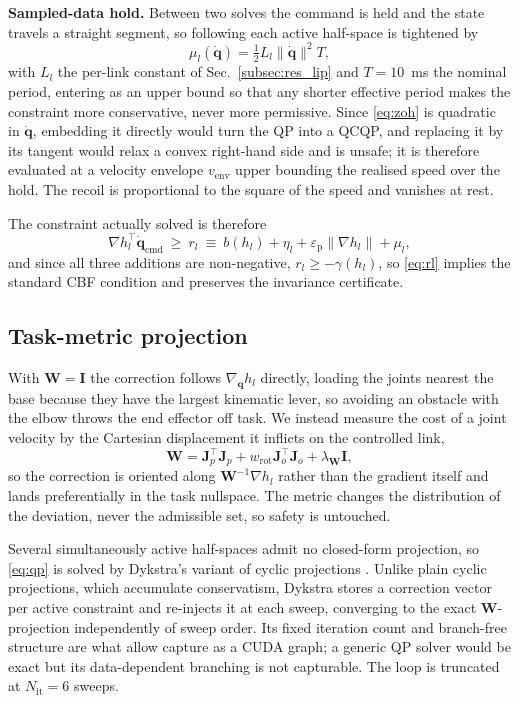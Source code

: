 \documentclass[journal]{IEEEtran}
\newcommand{\qdot}{\dot{\mathbf{q}}}
\begin{document}
\textbf{Sampled-data hold.} Between two solves the command is held and the state travels a straight segment, so following \cite{Breeden2022Sampled} each active half-space is tightened by
\begin{equation}\label{eq:zoh}
\mu_l(\qdot)=\tfrac12 L_l\|\qdot\|^2 T,
\end{equation}
with $L_l$ the per-link constant of Sec.~\ref{subsec:res_lip} and $T=10$~ms the nominal period, entering as an upper bound so that any shorter effective period makes the constraint more conservative, never more permissive. Since \eqref{eq:zoh} is quadratic in $\qdot$, embedding it directly would turn the QP into a QCQP, and replacing it by its tangent would relax a convex right-hand side and is unsafe; it is therefore evaluated at a velocity envelope $v_{\mathrm{env}}$ upper bounding the realised speed over the hold. The recoil is proportional to the square of the speed and vanishes at rest.

The constraint actually solved is therefore
\begin{equation}\label{eq:rl}
\nabla h_l^{\top}\qdot_{\mathrm{cmd}}\ \ge\ r_l\ \equiv\ b(h_l)+\eta_l+\varepsilon_{\mathrm{p}}\|\nabla h_l\|+\mu_l,
\end{equation}
and since all three additions are non-negative, $r_l\ge-\gamma(h_l)$, so \eqref{eq:rl} implies the standard CBF condition and preserves the invariance certificate.

\subsection{Task-metric projection}
With $\mathbf{W}=\mathbf{I}$ the correction follows $\nabla_{\mathbf{q}}h_l$ directly, loading the joints nearest the base because they have the largest kinematic lever, so avoiding an obstacle with the elbow throws the end effector off task. We instead measure the cost of a joint velocity by the Cartesian displacement it inflicts on the controlled link,
\begin{equation}
\mathbf{W}=\mathbf{J}_p^{\top}\mathbf{J}_p+w_{\mathrm{rot}}\mathbf{J}_o^{\top}\mathbf{J}_o+\lambda_{\mathbf{W}}\mathbf{I},
\end{equation}
so the correction is oriented along $\mathbf{W}^{-1}\nabla h_l$ rather than the gradient itself and lands preferentially in the task nullspace. The metric changes the distribution of the deviation, never the admissible set, so safety is untouched.

Several simultaneously active half-spaces admit no closed-form projection, so \eqref{eq:qp} is solved by Dykstra's variant of cyclic projections \cite{Dykstra1983Restricted}. Unlike plain cyclic projections, which accumulate conservatism, Dykstra stores a correction vector per active constraint and re-injects it at each sweep, converging to the exact $\mathbf{W}$-projection independently of sweep order. Its fixed iteration count and branch-free structure are what allow capture as a CUDA graph; a generic QP solver would be exact but its data-dependent branching is not capturable. The loop is truncated at $N_{\mathrm{it}}=6$ sweeps.
\end{document}
